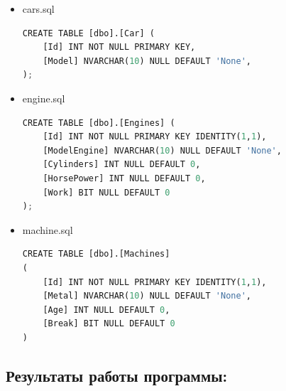 \documentclass[12pt]{article}
\begin{document}
\begin{itemize}
	\item cars.sql

	      \begin{lstlisting}[language = Python]
CREATE TABLE [dbo].[Car] (
    [Id] INT NOT NULL PRIMARY KEY,
    [Model] NVARCHAR(10) NULL DEFAULT 'None',
);


\end{lstlisting}

	\item engine.sql

	      \begin{lstlisting}[language = Python]
CREATE TABLE [dbo].[Engines] (
    [Id] INT NOT NULL PRIMARY KEY IDENTITY(1,1),
    [ModelEngine] NVARCHAR(10) NULL DEFAULT 'None', 
    [Cylinders] INT NULL DEFAULT 0,
    [HorsePower] INT NULL DEFAULT 0,
    [Work] BIT NULL DEFAULT 0
);

\end{lstlisting}

	      \break

	\item machine.sql

	      \begin{lstlisting}[language = Python ]
CREATE TABLE [dbo].[Machines]
(
    [Id] INT NOT NULL PRIMARY KEY IDENTITY(1,1),
    [Metal] NVARCHAR(10) NULL DEFAULT 'None',   
    [Age] INT NULL DEFAULT 0,
    [Break] BIT NULL DEFAULT 0 
)
\end{lstlisting}

\end{itemize}

\subsection*{Результаты работы программы:}
\end{document}
